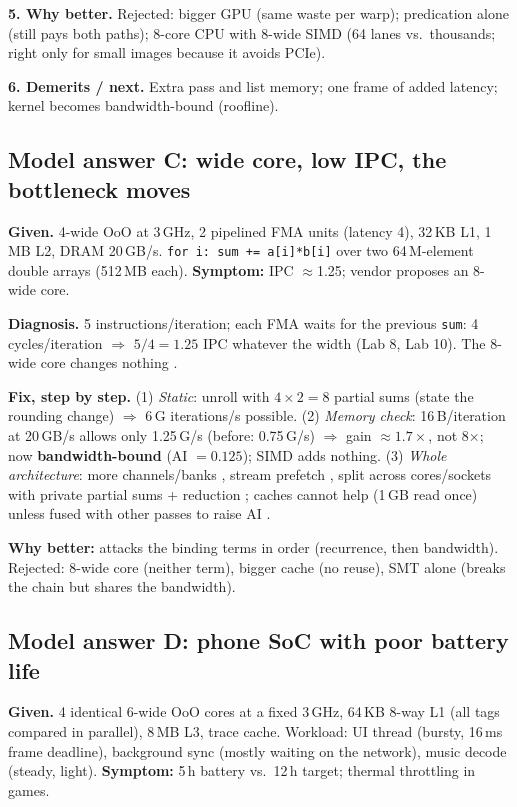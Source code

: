 \textbf{5. Why better.} Rejected: bigger GPU (same waste per warp); predication alone (still pays both paths); 8-core CPU with 8-wide SIMD (64 lanes vs.\ thousands; right only for small images because it avoids PCIe).

\textbf{6. Demerits / next.} Extra pass and list memory; one frame of added latency; kernel becomes bandwidth-bound (roofline).

\subsection{Model answer C: wide core, low IPC, the bottleneck moves}\label{sec:modelC}
\textbf{Given.} 4-wide OoO at 3\,GHz, 2 pipelined FMA units (latency 4), 32\,KB L1, 1\,MB L2, DRAM 20\,GB/s. \texttt{for i: sum += a[i]*b[i]} over two 64\,M-element double arrays (512\,MB each). \textbf{Symptom:} IPC $\approx$1.25; vendor proposes an 8-wide core.

\textbf{Diagnosis.} 5 instructions/iteration; each FMA waits for the previous \texttt{sum}: 4 cycles/iteration $\Rightarrow$ $5/4=1.25$ IPC whatever the width  (Lab 8, Lab 10). The 8-wide core changes nothing .

\textbf{Fix, step by step.} (1) \emph{Static}: unroll with $4\times2=8$ partial sums (state the rounding change) $\Rightarrow$ 6\,G iterations/s possible. (2) \emph{Memory check}: 16\,B/iteration at 20\,GB/s allows only 1.25\,G/s (before: 0.75\,G/s) $\Rightarrow$ gain $\approx1.7\times$, not 8$\times$; now \textbf{bandwidth-bound} (AI $=0.125$); SIMD adds nothing. (3) \emph{Whole architecture}: more channels/banks , stream prefetch , split across cores/sockets with private partial sums + reduction  ; caches cannot help (1\,GB read once) unless fused with other passes to raise AI .

\textbf{Why better:} attacks the binding terms in order (recurrence, then bandwidth). Rejected: 8-wide core (neither term), bigger cache (no reuse), SMT alone (breaks the chain but shares the bandwidth).

\subsection{Model answer D: phone SoC with poor battery life}\label{sec:modelD}
\textbf{Given.} 4 identical 6-wide OoO cores at a fixed 3\,GHz, 64\,KB 8-way L1 (all tags compared in parallel), 8\,MB L3, trace cache. Workload: UI thread (bursty, 16\,ms frame deadline), background sync (mostly waiting on the network), music decode (steady, light). \textbf{Symptom:} 5\,h battery vs.\ 12\,h target; thermal throttling in games.

